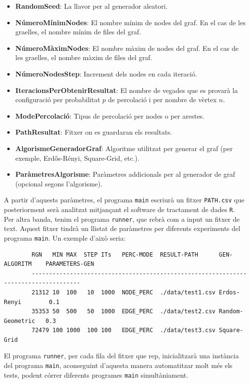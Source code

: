 \documentclass[a4paper]{article}
\begin{document}
	\begin{itemize}
		\item \textbf{RandomSeed}: La llavor per al generador aleatori.
		\item \textbf{NúmeroMínimNodes}: El nombre mínim de nodes del graf. En el cas de les graelles, el nombre mínim de files del graf.
		\item \textbf{NúmeroMàximNodes}: El nombre màxim de nodes del graf. En el cas de les graelles, el nombre màxim de files del graf.
		\item \textbf{NúmeroNodesStep}: Increment dels nodes en cada iteració.
		\item \textbf{IteracionsPerObtenirResultat}: El nombre de vegades que es provarà la configuració per probabilitat $p$ de percolació i per nombre de vèrtex $n$.
		\item \textbf{ModePercolació}: Tipus de percolació per nodes o per arestes.
		\item \textbf{PathResultat}: Fitxer on es guardaran els resultats.
		\item \textbf{AlgorismeGeneradorGraf}: Algoritme utilitzat per generar el graf (per exemple, Erdős-Rényi, Square-Grid, etc.).
		\item \textbf{ParàmetresAlgorisme}: Paràmetres addicionals per al generador de graf (opcional segons l'algorisme).
	\end{itemize}
	
	A partir d'aquests paràmetres, el programa \texttt{main} escriurà un fitxer \texttt{PATH.csv} que posteriorment serà analitzat mitjançant el software de tractament de dades \texttt{R}. \\
	
	Per altra banda, tenim el programa \texttt{runner}, que rebrà com a input un fitxer de text. Aquest fitxer tindrà un llistat de paràmetres per diferents experiments del programa \texttt{main}. Un exemple d'això seria:
	
	\begin{verbatim}
		RGN   MIN MAX  STEP ITs   PERC-MODE  RESULT-PATH      GEN-ALGORITM    PARAMETERS-GEN
		------------------------------------------------------------------------------------
		21312 10  100   10  1000  NODE_PERC  ./data/test1.csv Erdos-Renyi        0.1
		35353 50  500   50  1000  EDGE_PERC  ./data/test2.csv Random-Geometric   0.3
		72479 100 1000  100 100   EDGE_PERC  ./data/test3.csv Square-Grid
	\end{verbatim}
	
	El programa \texttt{runner}, per cada fila del fitxer que rep, inicialitzarà una instància del programa \texttt{main}, aconseguint d'aquesta manera automatitzar molt més els tests, podent córrer diferents programes \texttt{main} simultàniament.
	
\end{document}
